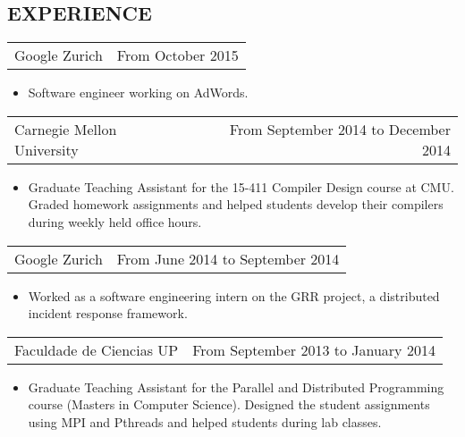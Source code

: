 \documentclass[margin]{res}
\begin{document}
\begin{resume}
\section{EXPERIENCE}
            
                  \begin{tabular}{p{3in} r} %
                    Google Zurich &  From October 2015
                   \end{tabular}
                    \begin{itemize}
                      \item[] Software engineer working on AdWords.
                    \end{itemize}
                  \begin{tabular}{p{3in} r} %
                    Carnegie Mellon University &  From September 2014 to December 2014
                   \end{tabular}
                    \begin{itemize}					        
                     \item[] Graduate Teaching Assistant for the 15-411 Compiler Design course at CMU. Graded homework assignments and helped students develop their compilers during weekly held office hours.
                    \end{itemize}

                  \begin{tabular}{p{3in} r} %
                    Google Zurich &  From June 2014 to September 2014
                   \end{tabular}
                    \begin{itemize}
                      \item[] Worked as a software engineering intern on the GRR project, a distributed incident response framework.
                    \end{itemize}

                  \begin{tabular}{p{3in} r} %
                    Faculdade de Ciencias UP &  From September 2013 to January 2014
                   \end{tabular}
                    \begin{itemize}					        
                     \item[] Graduate Teaching Assistant for the Parallel and Distributed Programming course (Masters in Computer Science). Designed the student assignments using MPI and Pthreads and helped students during lab classes.
                    \end{itemize}


\end{resume}
\end{document}
